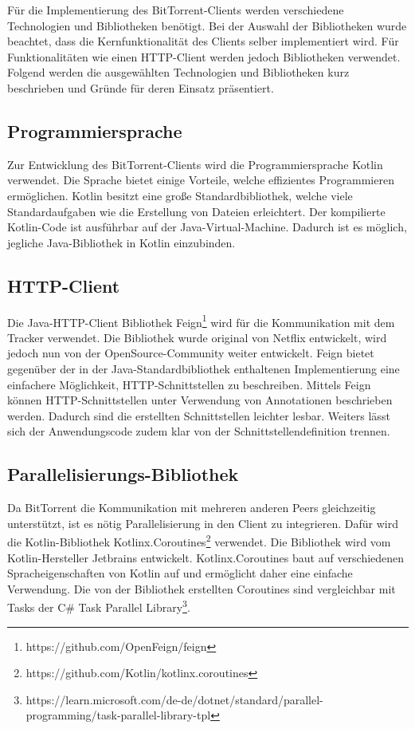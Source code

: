 Für die Implementierung des BitTorrent-Clients werden verschiedene Technologien und Bibliotheken benötigt. Bei der Auswahl der Bibliotheken wurde beachtet, dass die Kernfunktionalität des Clients selber implementiert wird. Für Funktionalitäten wie einen HTTP-Client werden jedoch Bibliotheken verwendet.
Folgend werden die ausgewählten Technologien und Bibliotheken kurz beschrieben und Gründe für deren Einsatz präsentiert.

\subsection{Programmiersprache}

Zur Entwicklung des BitTorrent-Clients wird die Programmiersprache Kotlin verwendet. Die Sprache bietet einige Vorteile, welche effizientes Programmieren ermöglichen. Kotlin besitzt eine große Standardbibliothek, welche viele Standardaufgaben wie die Erstellung von Dateien erleichtert. Der kompilierte Kotlin-Code ist ausführbar auf der Java-Virtual-Machine. Dadurch ist es möglich, jegliche Java-Bibliothek in Kotlin einzubinden. 

\subsection{HTTP-Client}

Die Java-HTTP-Client Bibliothek Feign\footnote[1]{https://github.com/OpenFeign/feign} wird für die Kommunikation mit dem Tracker verwendet. Die Bibliothek wurde original von Netflix entwickelt, wird jedoch nun von der OpenSource-Community weiter entwickelt. Feign bietet gegenüber der in der Java-Standardbibliothek enthaltenen Implementierung eine einfachere Möglichkeit, HTTP-Schnittstellen zu beschreiben. Mittels Feign  können HTTP-Schnittstellen unter Verwendung von Annotationen beschrieben werden. Dadurch sind die erstellten Schnittstellen leichter lesbar. Weiters lässt sich der Anwendungscode zudem klar von der Schnittstellendefinition trennen. 

\subsection{Parallelisierungs-Bibliothek}

Da BitTorrent die Kommunikation mit mehreren anderen Peers gleichzeitig unterstützt, ist es nötig Parallelisierung in den Client zu integrieren. Dafür wird die Kotlin-Bibliothek Kotlinx.Coroutines\footnote[2]{https://github.com/Kotlin/kotlinx.coroutines} verwendet. Die Bibliothek wird vom Kotlin-Hersteller Jetbrains entwickelt. Kotlinx.Coroutines baut auf verschiedenen Spracheigenschaften von Kotlin auf und ermöglicht daher eine einfache Verwendung. Die von der Bibliothek erstellten Coroutines sind vergleichbar mit Tasks der C\# Task Parallel Library\footnote[3]{https://learn.microsoft.com/de-de/dotnet/standard/parallel-programming/task-parallel-library-tpl}. 
 
